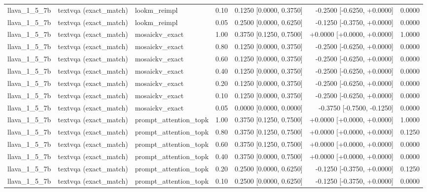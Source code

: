 \begin{longtable}{lllrrrr}
llava\_1\_5\_7b & textvqa (exact\_match) & lookm\_reimpl & 0.10 & 0.1250 [0.0000, 0.3750] & -0.2500 [-0.6250, +0.0000] & 0.0000 \\
llava\_1\_5\_7b & textvqa (exact\_match) & lookm\_reimpl & 0.05 & 0.2500 [0.0000, 0.6250] & -0.1250 [-0.3750, +0.0000] & 0.0000 \\
llava\_1\_5\_7b & textvqa (exact\_match) & mosaickv\_exact & 1.00 & 0.3750 [0.1250, 0.7500] & +0.0000 [+0.0000, +0.0000] & 1.0000 \\
llava\_1\_5\_7b & textvqa (exact\_match) & mosaickv\_exact & 0.80 & 0.1250 [0.0000, 0.3750] & -0.2500 [-0.6250, +0.0000] & 0.0000 \\
llava\_1\_5\_7b & textvqa (exact\_match) & mosaickv\_exact & 0.60 & 0.1250 [0.0000, 0.3750] & -0.2500 [-0.6250, +0.0000] & 0.0000 \\
llava\_1\_5\_7b & textvqa (exact\_match) & mosaickv\_exact & 0.40 & 0.1250 [0.0000, 0.3750] & -0.2500 [-0.6250, +0.0000] & 0.0000 \\
llava\_1\_5\_7b & textvqa (exact\_match) & mosaickv\_exact & 0.20 & 0.1250 [0.0000, 0.3750] & -0.2500 [-0.6250, +0.0000] & 0.0000 \\
llava\_1\_5\_7b & textvqa (exact\_match) & mosaickv\_exact & 0.10 & 0.1250 [0.0000, 0.3750] & -0.2500 [-0.6250, +0.0000] & 0.0000 \\
llava\_1\_5\_7b & textvqa (exact\_match) & mosaickv\_exact & 0.05 & 0.0000 [0.0000, 0.0000] & -0.3750 [-0.7500, -0.1250] & 0.0000 \\
llava\_1\_5\_7b & textvqa (exact\_match) & prompt\_attention\_topk & 1.00 & 0.3750 [0.1250, 0.7500] & +0.0000 [+0.0000, +0.0000] & 1.0000 \\
llava\_1\_5\_7b & textvqa (exact\_match) & prompt\_attention\_topk & 0.80 & 0.3750 [0.1250, 0.7500] & +0.0000 [+0.0000, +0.0000] & 0.1250 \\
llava\_1\_5\_7b & textvqa (exact\_match) & prompt\_attention\_topk & 0.60 & 0.3750 [0.1250, 0.7500] & +0.0000 [+0.0000, +0.0000] & 0.0000 \\
llava\_1\_5\_7b & textvqa (exact\_match) & prompt\_attention\_topk & 0.40 & 0.3750 [0.0000, 0.7500] & +0.0000 [+0.0000, +0.0000] & 0.0000 \\
llava\_1\_5\_7b & textvqa (exact\_match) & prompt\_attention\_topk & 0.20 & 0.2500 [0.0000, 0.6250] & -0.1250 [-0.3750, +0.0000] & 0.1250 \\
llava\_1\_5\_7b & textvqa (exact\_match) & prompt\_attention\_topk & 0.10 & 0.2500 [0.0000, 0.6250] & -0.1250 [-0.3750, +0.0000] & 0.0000 \\

\end{longtable}
